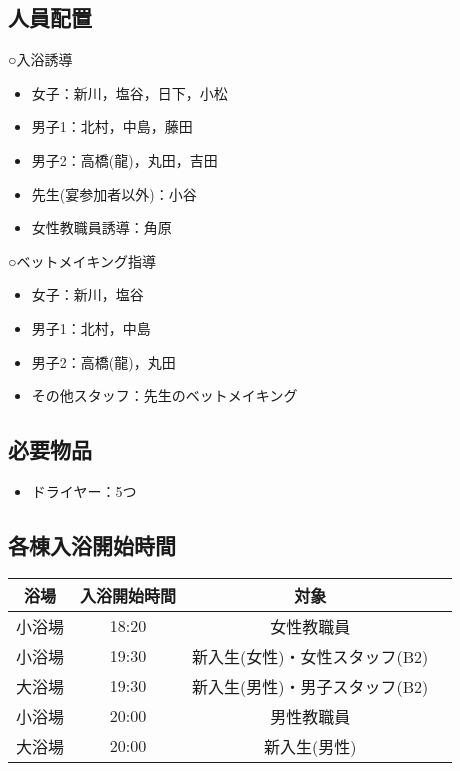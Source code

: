 \subsection{人員配置}
○入浴誘導
\begin{itemize}
 \item 女子：新川，塩谷，日下，小松
 \item 男子1：北村，中島，藤田
 \item 男子2：高橋(龍)，丸田，吉田
 \item 先生(宴参加者以外)：小谷
 \item 女性教職員誘導：角原
\end{itemize}

\newpage

○ベットメイキング指導
\begin{itemize}
\item 女子：新川，塩谷
\item 男子1：北村，中島
\item 男子2：高橋(龍)，丸田
\item その他スタッフ：先生のベットメイキング
\end{itemize}
\subsection{必要物品}
\begin{itemize}
\item ドライヤー：5つ
\end{itemize}

\subsection{各棟入浴開始時間}
\label{sec:bath}
\begin{table}[h]
\begin{tabular}{|c|c|c|l|}
\hline
{浴場}&{入浴開始時間}&\multicolumn{1}{c|}{対象} \\ \hline\hline
 小浴場 & 18:20 & 女性教職員 \\ \hline
 小浴場 & 19:30 & 新入生(女性)・女性スタッフ(B2)\\ \hline
 大浴場 & 19:30 & 新入生(男性)・男子スタッフ(B2) \\ \hline 
 小浴場 & 20:00 & 男性教職員 \\ \hline
 大浴場 & 20:00 & 新入生(男性)\\ \hline
 \end{tabular}
\end{table}
